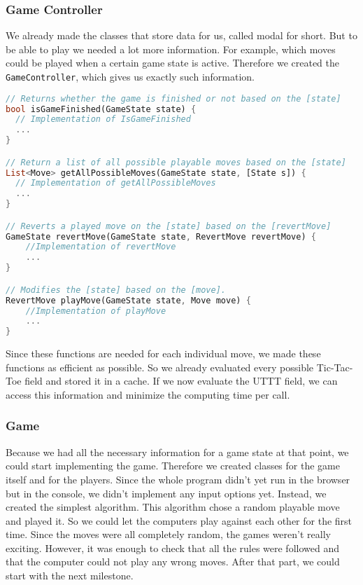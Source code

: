 \subsubsection{Game Controller}
We already made the classes that store data for us, called modal for short. But to be able to play we needed a lot more information. For example, which moves could be played when a certain game state is active. Therefore we created the \texttt{GameController}, which gives us exactly such information.
\begin{lstlisting}[language=Dart,caption={Structure of the \texttt{GameController}}]
// Returns whether the game is finished or not based on the [state]
bool isGameFinished(GameState state) {
  // Implementation of IsGameFinished
  ...
}

// Return a list of all possible playable moves based on the [state]
List<Move> getAllPossibleMoves(GameState state, [State s]) {
  // Implementation of getAllPossibleMoves
  ...
}

// Reverts a played move on the [state] based on the [revertMove]
GameState revertMove(GameState state, RevertMove revertMove) {
	//Implementation of revertMove
	...
}

// Modifies the [state] based on the [move].
RevertMove playMove(GameState state, Move move) {
	//Implementation of playMove
	...
}
\end{lstlisting}
Since these functions are needed for each individual move, we made these functions as efficient as possible. So we already evaluated every possible Tic-Tac-Toe field and stored it in a cache. If we now evaluate the \ac{UTTT} field, we can access this information and minimize the computing time per call.

\subsubsection{Game}
Because we had all the necessary information for a game state at that point, we could start implementing the game. Therefore we created classes for the game itself and for the players. Since the whole program didn't yet run in the browser but in the console, we didn't implement any input options yet. Instead, we created the simplest algorithm. This algorithm chose a random playable move and played it. So we could let the computers play against each other for the first time. Since the moves were all completely random, the games weren't really exciting. However, it was enough to check that all the rules were followed and that the computer could not play any wrong moves. After that part, we could start with the next milestone.

